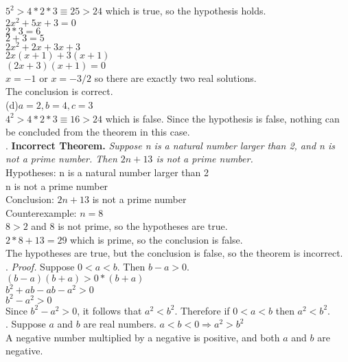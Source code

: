\documentclass{article}
\begin{document}
 $5^2 > 4 * 2 * 3 \equiv 25 > 24$ which is true, so the hypothesis holds. \\
 $2x^2 + 5x + 3 = 0$\\
 $2 * 3 = 6$\\
 $2 + 3 = 5$\\
 $2x^2 + 2x + 3x + 3$\\
 $2x(x + 1) + 3 (x + 1)$\\
 $(2x + 3)(x + 1) = 0$\\
 $x = -1$ or $x = -3/2$ so there are exactly two real solutions.\\ 
 The conclusion is correct.\\
 \linebreak
 (d)$a = 2, b = 4, c = 3$\\
 $4^2 > 4 * 2 * 3 \equiv 16 > 24$ which is false. Since the hypothesis is false, nothing can be concluded from the theorem in this case.\\
 . \textbf{Incorrect Theorem.} \textit{Suppose n is a natural number larger than 2, and n is not a prime number. Then $2n + 13$ is not a prime number. }\\
 Hypotheses: n is a natural number larger than 2\\
             n is not a prime number\\
 Conclusion: $2n + 13$ is not a prime number\\
 Counterexample: $n = 8$\\
 $8 > 2$ and 8 is not prime, so the hypotheses are true.\\
 $2 * 8 + 13 = 29$ which is prime, so the conclusion is false.\\
 The hypotheses are true, but the conclusion is false, so the theorem is incorrect.\\
 . \textit{Proof.} Suppose $ 0 < a < b $. Then $b - a > 0$.\\
$(b - a)(b + a) > 0 * (b + a)$\\
$b^2 + ab - ab - a^2 > 0$\\
$b^2 - a^2 > 0$\\
Since $b^2 - a^2 > 0$, it follows that $a^2 < b^2$. Therefore if $0 < a < b$ then $a^2 < b^2$.\\
. Suppose $a$ and $b$ are real numbers. $a < b < 0 \Rightarrow a^2 > b^2$\\
A negative number multiplied by a negative is positive, and both $a$ and $b$ are negative.\\
\end{document}
